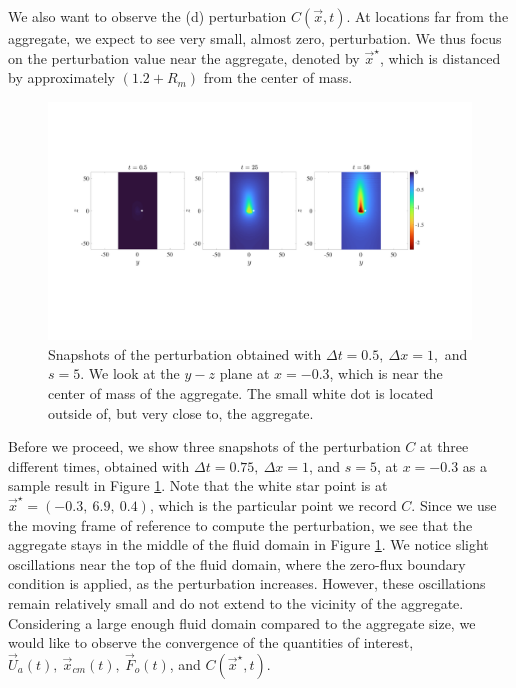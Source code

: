 We also want to observe the (d) perturbation $C(\vec{x},t)$. At locations far from the aggregate, we expect to see very small, almost zero, perturbation.
We thus focus on the perturbation value near the aggregate, denoted by $\vec{x}^{\star}$, which is distanced by approximately $(1.2 + R_m)$ from the center of mass. 
\par
\begin{figure}[ht]
	\begin{center}
		\includegraphics[scale=0.26]{./figures/fig_NC10_snaps_all.pdf}
		\caption{Snapshots of the perturbation obtained with $\Delta t = 0.5, \ \Delta x = 1,$ and $s = 5$. We look at the $y-z$ plane at $x = -0.3$, which is near the center of mass of the aggregate. The small white dot is located outside of, but very close to, the aggregate.}
		\label{fig_NC10_snaps_all}
	\end{center}
\end{figure}
Before we proceed, we show three snapshots of the perturbation $C$ at three different times, obtained with $\Delta t = 0.75, \ \Delta x = 1$, and $s = 5$, at $x = -0.3$ as a sample result in Figure \ref{fig_NC10_snaps_all}. Note that the white star point is at ${\vec{x}^{\star}} = (-0.3, \    6.9, \      0.4)$, which is the particular point we record $C$. Since we use the moving frame of reference to compute the perturbation, we see that the aggregate stays in the middle of the fluid domain in Figure \ref{fig_NC10_snaps_all}.
We notice slight oscillations near the top of the fluid domain, where the zero-flux boundary condition is applied, as the perturbation increases. 
However, these oscillations remain relatively small and do not extend to the vicinity of the aggregate. 
Considering a large enough fluid domain compared to the aggregate size, we would like to observe the convergence of the quantities of interest, $\vec{U}_a(t), \ \vec{x}_{cm} (t), \ \vec{F}_o(t)$, and $C(\vec{x}^{\star}, t)$.
